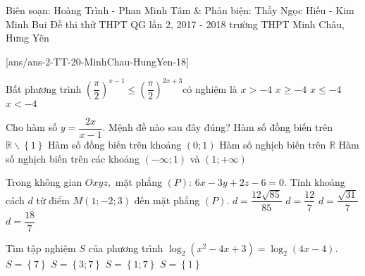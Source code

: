 \begin{name}
{Biên soạn: Hoàng Trình -  Phan Minh Tâm \& Phản biện: Thầy Ngọc Hiếu - Kim Minh Bui}
{Đề thi thử THPT QG lần 2, 2017 - 2018 trường THPT Minh Châu, Hưng Yên}
\end{name}
\setcounter{ex}{0}\setcounter{bt}{0}
[ans/ans-2-TT-20-MinhChau-HungYen-18]
	
\begin{ex}%
	Bất phương trình ${\left(\dfrac{\pi}{2}\right)}^{x-1}\le {\left(\dfrac{\pi}{2}\right)}^{2x+3}$có nghiệm là
	\choice
	{$x>-4$}
	{\True $x\ge-4$}
	{$x\le-4$}
	{$x<-4$}
\end{ex}
\begin{ex}%
	Cho hàm số $y=\dfrac{2x}{x-1}$. Mệnh đề nào sau đây đúng?
	\choice
	{Hàm số đồng biến trên $\mathbb{R}\backslash \left\{1\right\}$}
	{Hàm số đồng biến trên khoảng $\left(0;1\right)$}
	{Hàm số nghịch biến trên $\mathbb{R}$}
	{\True Hàm số nghịch biến trên các khoảng $\left(-\infty;1\right)$ và $\left(1;+\infty \right)$}
\end{ex}
\begin{ex}%
	Trong không gian $Oxyz,$ mặt phẳng $(P)$: $6x-3y+2z-6=0.$ Tính khoảng cách $d$ từ điểm $M\left(1;-2;3\right)$ đến mặt phẳng $(P)$. 
	\choice
	{$d=\dfrac{12\sqrt{85}}{85}$}
	{\True $d=\dfrac{12}{7}$}
	{$d=\dfrac{\sqrt{31}}{7}$}
	{$d=\dfrac{18}{7}$}
\end{ex}
\begin{ex}%
	Tìm tập nghiệm $S$ của phương trình $\log_2\left(x^2-4x+3\right)=\log_2\left(4x-4\right)$.
	\choice
	{\True $S=\left\{7\right\}$}
	{$S=\left\{3;7\right\}$}
	{$S=\left\{1;7\right\}$}
	{$S=\left\{1\right\}$}
\end{ex}
